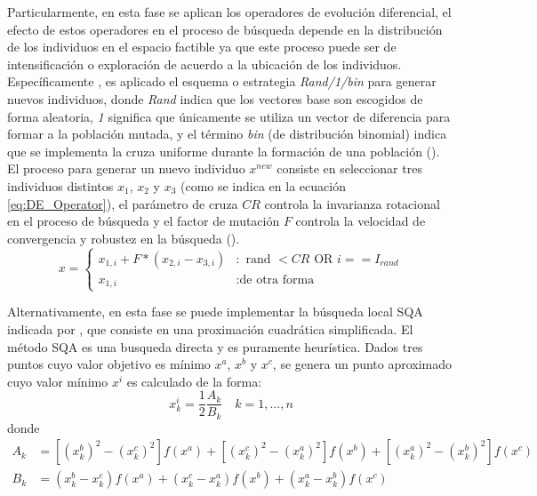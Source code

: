Particularmente, en esta fase se aplican los operadores de evolución diferencial, el efecto de estos operadores en el proceso de búsqueda depende en la distribución de los individuos en el espacio factible ya que este proceso puede ser de intensificación o exploración de acuerdo a la ubicación de los individuos.
%
Específicamente , es aplicado el esquema o estrategia \textit{Rand/1/bin} para generar nuevos individuos, donde \textit{Rand} indica que los vectores base son escogidos de forma aleatoria, \textit{1} significa que únicamente se utiliza un vector de diferencia para formar a la población mutada, y el término \textit{bin} (de distribución binomial) indica que se implementa la cruza uniforme durante la formación de una población (\cite{Storn1997}).
%
El proceso para generar un nuevo individuo $x^{new}$ consiste en seleccionar tres individuos distintos $x_1$, $x_2$ y $x_3$ (como se indica en la ecuación \ref{eq:DE_Operator}), el parámetro de cruza $CR$ controla la invarianza rotacional en el proceso de búsqueda y el factor de mutación $F$ controla la velocidad de convergencia y robustez en la búsqueda (\cite{kukkonen2009performance}).
%
\begin{equation} \label{eq:DE_Operator}
x =
  \begin{cases}
    x_{1,i} + F*(x_{2,i} - x_{3,i}  ) &: \text{ rand $< CR$ OR $i == I_{rand}$} \\
    x_{1,i} &: \text{de otra forma} 
  \end{cases}
\end{equation}%


Alternativamente, en esta fase se puede implementar la búsqueda local SQA indicada por \citeauthor{Joel:LOCALSEARCH}, que consiste en una proximación cuadrática simplificada.
%
El método SQA es una busqueda directa y es puramente heurística.
%
Dados tres puntos cuyo valor objetivo es mínimo $x^a$, $x^b$ y $x^c$, se genera un punto aproximado cuyo valor mínimo $x^i$ es calculado de la forma:
\begin{equation}
x_k^i = \frac{1}{2} \frac{A_k}{B_k} \quad k=1,...,n
\end{equation}
donde\\
\begin{equation*}
\begin{split}
A_k &=[(x_k^b)^2 - (x_k^c)^2] f(x^a) + [(x_k^c)^2 - (x_k^a)^2] f(x^b) + [(x_k^a)^2 - (x_k^b)^2] f(x^c) \\
B_k &=(x_k^b - x_k^c) f(x^a) + (x_k^c - x_k^a) f(x^b) + (x_k^a - x_k^b) f(x^c)
\end{split}
\end{equation*}

